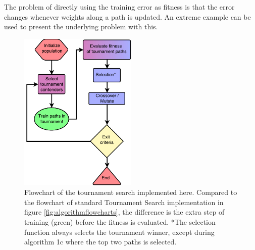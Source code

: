 The problem of directly using the training error as fitness is that the error changes whenever weights along a path is updated. An extreme example can be used to present the underlying problem with this.

\begin{figure}[ht]
    \centering
    \includegraphics[width=0.5\textwidth]{Chapters/4.Experiments/exp2/figures/TS_implementation.pdf}
    \caption[Tournament search flowchart]{Flowchart of the tournament search implemented here. Compared to the flowchart of standard Tournament Search implementation in figure \ref{fig:algorithmflowcharts}, the difference is the extra step of training (green) before the fitness is evaluated. *The selection function always selects the tournament winner, except during algorithm 1c where the top two paths is selected.}
    \label{fig:ts_flowchart}
\end{figure}

